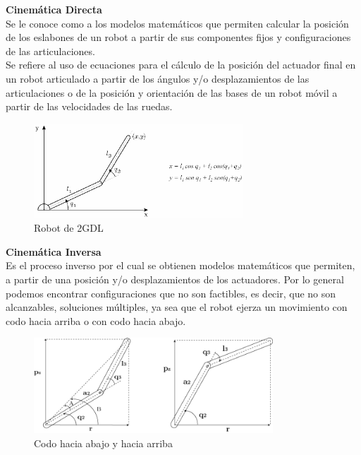 \textbf{Cinemática Directa}\\
Se le conoce como a los modelos matemáticos que permiten calcular la posición de los eslabones de un robot a partir de sus componentes fijos y configuraciones de las articulaciones.\\
Se refiere al uso de ecuaciones para el cálculo de la posición del actuador final en un robot articulado a partir de los ángulos y/o desplazamientos de las articulaciones o de la posición y orientación de las bases de un robot móvil a partir de las velocidades de las ruedas.\\

\begin{figure}[!h]
\centering
\includegraphics[width=0.7\textwidth, height=0.25\textheight]{./figs/robot2GDL_cinematica_directa}
\caption{Robot de 2GDL}
\label{robot2gdl}
\end{figure}

\newpage
\textbf{Cinemática Inversa}\\
Es el proceso inverso por el cual se obtienen modelos matemáticos que permiten, a partir de una posición y/o desplazamientos de los actuadores. Por lo general podemos encontrar configuraciones que no son factibles, es decir, que no son alcanzables, soluciones múltiples, ya sea que el robot ejerza un movimiento con codo hacia arriba o con codo hacia abajo.

\begin{figure}[!h]
\centering
\includegraphics[width=0.8\textwidth, height=0.27\textheight]{./figs/codoarribaabajo}
\caption{Codo hacia abajo y hacia arriba}
\label{codos}
\end{figure}

